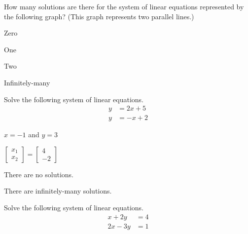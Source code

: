 \documentclass{article}
\begin{document}
\begin{readinessAssuranceTest}
\item How many solutions are there for the system of linear equations
      represented by the following graph? (This graph represents two
      parallel lines.)
    \begin{center}
      \systemWithNoSolutions
    \end{center}

\begin{multicols}{4}
\begin{readinessAssuranceTestChoices}
\item Zero
\item One
\item Two
\item Infinitely-many
\end{readinessAssuranceTestChoices}
\end{multicols}

\item Solve the following system of linear equations.
      \begin{align*}
      y   &=   2x+5 \\
      y  &=  -x+2
      \end{align*}

\begin{multicols}{4}
\begin{readinessAssuranceTestChoices}
\item
\(x=-1\) and \(y=3\) %
\item
\(
  \begin{bmatrix}
    x_1 \\
    x_2
  \end{bmatrix}=
  \begin{bmatrix}
    4 \\
    -2
  \end{bmatrix}
\)
\item There are no solutions.
\item There are infinitely-many solutions.
\end{readinessAssuranceTestChoices}
\end{multicols}

\item Solve the following system of linear equations.
      \begin{align*}
      x+2y   &=   4 \\
      2x-3y  &=  1
      \end{align*}


\end{readinessAssuranceTest}
\end{document}
